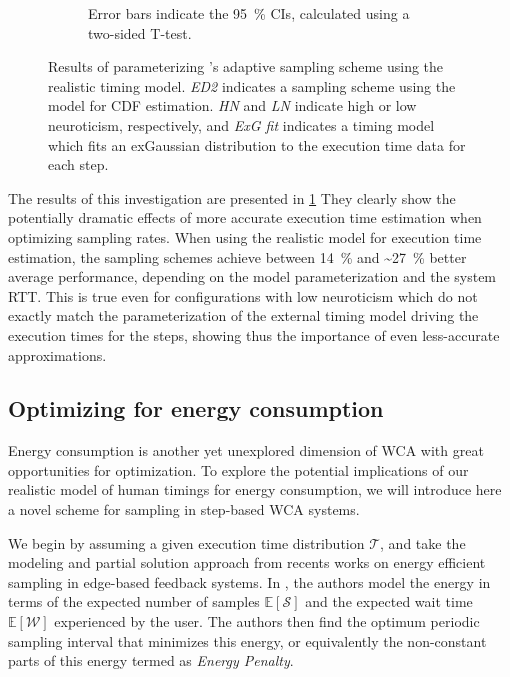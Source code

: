 \begin{figure}
\begin{subfigure}[]{\textwidth}
{            Error bars indicate the \SI{95}{\percent} \acp{CI}, calculated using a two-sided T-test.
        }
    \end{subfigure}
    \caption{%
        Results of parameterizing \textcite{Wang2019Towards}'s adaptive sampling scheme using the realistic timing model.
        \emph{ED2} indicates a sampling scheme using the \edgedroid{} model for \ac{CDF} estimation.
        \emph{HN} and \emph{LN} indicate high or low neuroticism, respectively, and \emph{ExG fit} indicates a timing model which fits an \ac{exGaussian} distribution to the execution time data for each step.
    }\label{fig:samples}
\end{figure}

The results of this investigation are presented in \cref{fig:samples}
They clearly show the potentially dramatic effects of more accurate execution time estimation when optimizing sampling rates.
When using the realistic model for execution time estimation, the sampling schemes achieve between \SI{14}{\percent} and \textasciitilde\SI{27}{\percent} better average performance, depending on the \edgedroid{} model parameterization and the system \ac{RTT}.
This is true even for configurations with low neuroticism which do not exactly match the parameterization of the external timing model driving the execution times for the steps, showing thus the importance of even less-accurate approximations.

\subsection{Optimizing for energy consumption}

Energy consumption is another yet unexplored dimension of \ac{WCA} with great opportunities for optimization.
To explore the potential implications of our realistic model of human timings for energy consumption, we will introduce here a novel scheme for sampling in step-based \ac{WCA} systems.

We begin by assuming a given execution time distribution \( \mathcal{T} \), and take the modeling and partial solution approach from recents works on energy efficient sampling in edge-based feedback systems.
In \textcite{ICCperiodic1,TMCperiodic}, the authors model the energy in terms of the expected number of samples $\mathbb{E}[\mathcal{S}]$ and the expected wait time $\mathbb{E}[\mathcal{W}]$ experienced by the user.
The authors then find the optimum periodic sampling interval that minimizes this energy, or equivalently the non-constant parts of this energy termed as \textit{Energy Penalty}.

